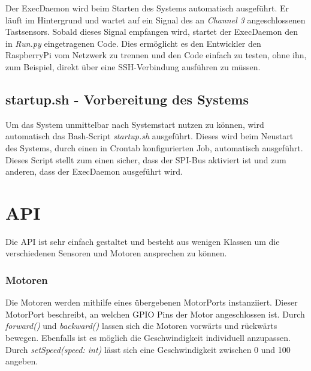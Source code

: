 Der ExecDaemon wird beim Starten des Systems automatisch ausgeführt. Er läuft im Hintergrund und wartet auf ein Signal des an \emph{Channel 3} angeschlossenen Tastsensors. Sobald dieses Signal empfangen wird, startet der ExecDaemon den in \emph{Run.py} eingetragenen Code. Dies ermöglicht es den Entwickler den RaspberryPi vom Netzwerk zu trennen und den Code einfach zu testen, ohne ihn, zum Beispiel, direkt über eine SSH-Verbindung ausführen zu müssen.

\subsection{startup.sh - Vorbereitung des Systems}

Um das System unmittelbar nach Systemstart nutzen zu können, wird automatisch das Bash-Script \emph{startup.sh} ausgeführt. Dieses wird beim Neustart des Systems, durch einen in Crontab konfigurierten Job, automatisch ausgeführt. Dieses Script stellt zum einen sicher, dass der SPI-Bus aktiviert ist und zum anderen, dass der ExecDaemon ausgeführt wird.

\section{API}

Die API ist sehr einfach gestaltet und besteht aus wenigen Klassen um die verschiedenen Sensoren und Motoren ansprechen zu können. 


\clearpage %

\subsubsection{Motoren}
Die Motoren werden mithilfe eines übergebenen MotorPorts instanziiert. Dieser MotorPort beschreibt, an welchen GPIO Pins der Motor angeschlossen ist. Durch \emph{forward()} und \emph{backward()} lassen sich die Motoren vorwärts und rückwärts bewegen. Ebenfalls ist es möglich die Geschwindigkeit individuell anzupassen. Durch \emph{setSpeed(speed: int)} lässt sich eine Geschwindigkeit zwischen 0 und 100 angeben. 

